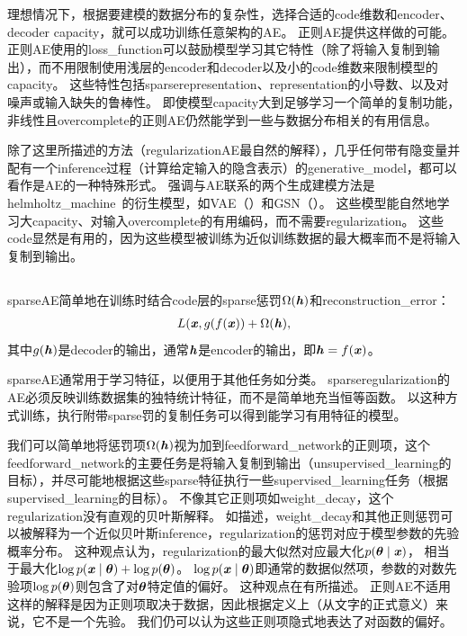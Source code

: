 理想情况下，根据要建模的数据分布的复杂性，选择合适的\gls{code}维数和\gls{encoder}、\gls{decoder}
\gls{capacity}，就可以成功训练任意架构的\gls{AE}。
正则\gls{AE}提供这样做的可能。
正则\gls{AE}使用的\gls{loss_function}可以鼓励模型学习其它特性（除了将输入复制到输出），而不用限制使用浅层的\gls{encoder}和\gls{decoder}以及小的\gls{code}维数来限制模型的\gls{capacity}。
这些特性包括\gls{sparse}\gls{representation}、\gls{representation}的小导数、以及对噪声或输入缺失的鲁棒性。
即使模型\gls{capacity}大到足够学习一个简单的复制功能，非线性且\gls{overcomplete}的正则\gls{AE}仍然能学到一些与数据分布相关的有用信息。


除了这里所描述的方法（\gls{regularization}\gls{AE}最自然的解释），几乎任何带有隐变量并配有一个\gls{inference}过程（计算给定输入的隐含表示）的\gls{generative_model}，都可以看作是\gls{AE}的一种特殊形式。
强调与\gls{AE}联系的两个生成建模方法是\gls{helmholtz_machine}~\citep{Hinton95}的衍生模型，如\gls{VAE}（）和\gls{GSN}（）。
这些模型能自然地学习大\gls{capacity}、对输入\gls{overcomplete}的有用编码，而不需要\gls{regularization}。
这些\gls{code}显然是有用的，因为这些模型被训练为近似训练数据的最大概率而不是将输入复制到输出。


\subsection{}
\label{sec:sparse_autoencoders}
\gls{sparse}\gls{AE}简单地在训练时结合\gls{code}层的\gls{sparse}惩罚$\Omega(\boldsymbol{\mathit{h}})$和\gls{reconstruction_error}：
\begin{align}
L(\boldsymbol{\mathit{x}}, g(f(\boldsymbol{\mathit{x}})) + \Omega(\boldsymbol{\mathit{h}}),
\end{align}
其中$g(\boldsymbol{\mathit{h}})$是\gls{decoder}的输出，通常$\boldsymbol{\mathit{h}}$是\gls{encoder}的输出，即$\boldsymbol{\mathit{h}} = f(\boldsymbol{\mathit{x}})$。


\gls{sparse}\gls{AE}通常用于学习特征，以便用于其他任务如分类。
\gls{sparse}\gls{regularization}的\gls{AE}必须反映训练数据集的独特统计特征，而不是简单地充当恒等函数。
以这种方式训练，执行附带\gls{sparse}罚的复制任务可以得到能学习有用特征的模型。


我们可以简单地将惩罚项$\Omega(\boldsymbol{\mathit{h}})$视为加到\gls{feedforward_network}的正则项，这个\gls{feedforward_network}的主要任务是将输入复制到输出（\gls{unsupervised_learning}的目标），并尽可能地根据这些\gls{sparse}特征执行一些\gls{supervised_learning}任务（根据\gls{supervised_learning}的目标）。
不像其它正则项如\gls{weight_decay}，这个\gls{regularization}没有直观的贝叶斯解释。
如描述，\gls{weight_decay}和其他正则惩罚可以被解释为一个近似贝叶斯\gls{inference}，\gls{regularization}的惩罚对应于模型参数的先验概率分布。
这种观点认为，\gls{regularization}的最大似然对应最大化$p(\boldsymbol{\theta} \mid \boldsymbol{\mathit{x}})$， 相当于最大化$\log p(\boldsymbol{\mathit{x}} \mid \boldsymbol{\theta}) + \log p(\boldsymbol{\theta})$。 $\log p(\boldsymbol{\mathit{x}} \mid \boldsymbol{\theta})$即通常的数据似然项，参数的对数先验项$\log p(\boldsymbol{\theta})$则包含了对$\boldsymbol{\theta}$特定值的偏好。
这种观点在有所描述。
正则\gls{AE}不适用这样的解释是因为正则项取决于数据，因此根据定义上（从文字的正式意义）来说，它不是一个先验。
我们仍可以认为这些正则项隐式地表达了对函数的偏好。

